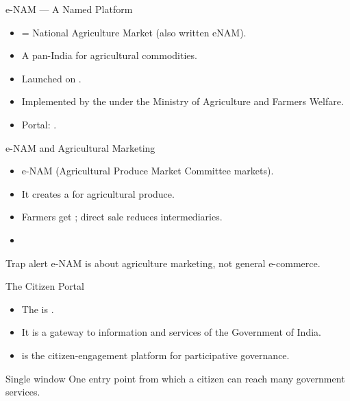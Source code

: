 \documentclass[aspectratio=169]{beamer}
\begin{document}
\begin{frame}{e-NAM --- A Named Platform}
  \begin{itemize}
    \item {} = National Agriculture Market (also written eNAM).
    \item A pan-India  for agricultural
      commodities.
    \item Launched on .
    \item Implemented by the  under the Ministry of Agriculture and Farmers Welfare.
    \item Portal: .
  \end{itemize}
\end{frame}

\begin{frame}{e-NAM and Agricultural Marketing}
  \begin{itemize}
    \item e-NAM  (Agricultural Produce
      Market Committee markets).
    \item It creates a  for agricultural
      produce.
    \item Farmers get ; direct sale reduces intermediaries.
    \item {}
  \end{itemize}
  \begin{alertblock}{Trap alert}
    e-NAM is about agriculture marketing, not general e-commerce.
  \end{alertblock}
\end{frame}

\begin{frame}{The Citizen Portal}
  \begin{itemize}
    \item The  is .
    \item It is a  gateway to information and services of
      the Government of India.
    \item {} is the citizen-engagement platform for participative
      governance.
  \end{itemize}
  \begin{block}{Single window}
    One entry point from which a citizen can reach many government services.
  \end{block}
\end{frame}
\end{document}
